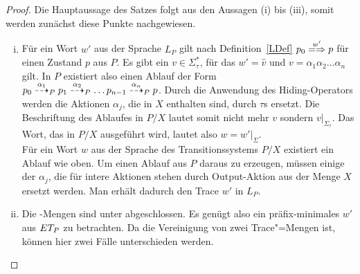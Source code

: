 \begin{proof}
  Die Hauptaussage des Satzes folgt aus den Aussagen (i) bis (iii), somit
  werden zunächst diese Punkte nachgewiesen.
  \begin{enumerate}[(i)]
    \item Für ein Wort $w'$ aus der Sprache $L_P$ gilt nach
      Definition~\ref{LDef} $p_0 \weakmay[w'] p$ für einen Zustand $p$ aus $P$.
      Es gibt ein $v\in \Sigma_{\tau} ^*$, für das $w' = \hat{v}$ und $v =
      \alpha _1\alpha _2\dots \alpha _n$ gilt. In $P$ existiert also einen
      Ablauf der Form $p_0 \may[\alpha _1]_P p_1 \may[\alpha _2]_P \dots
      p_{n-1} \may[\alpha _n]_P p$. Durch die Anwendung des Hiding-Operators
      werden die Aktionen $\alpha _j$, die in $X$ enthalten sind, durch $\tau$s
      ersetzt. Die Beschriftung des Ablaufes in $P/X$ lautet somit nicht mehr
      $v$ sondern $v|_{\Sigma _{\tau}}$. Das Wort, das in $P/X$ ausgeführt
      wird, lautet also $w=w'|_{\Sigma}$.\\
      Für ein Wort $w$ aus der Sprache des Transitionssystems $P/X$ existiert
      ein Ablauf wie oben. Um einen Ablauf aus $P$ daraus zu erzeugen, müssen
      einige der $\alpha _j$, die für intere Aktionen stehen durch
      Output-Aktion aus der Menge $X$ ersetzt werden. Man erhält dadurch den
      Trace $w'$ in $L_P$.
    \item Die \ET{}-Mengen sind unter \cont{} abgeschlossen. Es genügt also ein
      präfix-minimales $w'$ aus $ET _{P}$ zu betrachten. Da \ET{} die
      Vereinigung von zwei Trace"=Mengen ist, können hier zwei Fälle
      unterschieden werden.
\end{enumerate}
\end{proof}
